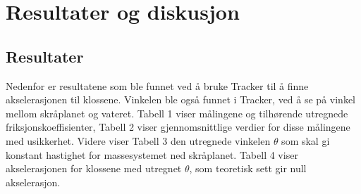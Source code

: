 \documentclass[10pt,a4paper]{report}
\begin{document}
\chapter*{Resultater og diskusjon}
\section*{Resultater}
Nedenfor er resultatene som ble funnet ved å bruke Tracker til å finne akselerasjonen til klossene. Vinkelen ble også funnet i Tracker, ved å se på vinkel mellom skråplanet og vateret. Tabell 1 viser målingene og tilhørende utregnede friksjonskoeffisienter, Tabell 2 viser gjennomsnittlige verdier for disse målingene med usikkerhet. Videre viser Tabell 3 den utregnede vinkelen $\theta$ som skal gi konstant hastighet for massesystemet ned skråplanet. Tabell 4 viser akselerasjonen for klossene med utregnet $\theta$, som teoretisk sett gir null akselerasjon.
\end{document}

